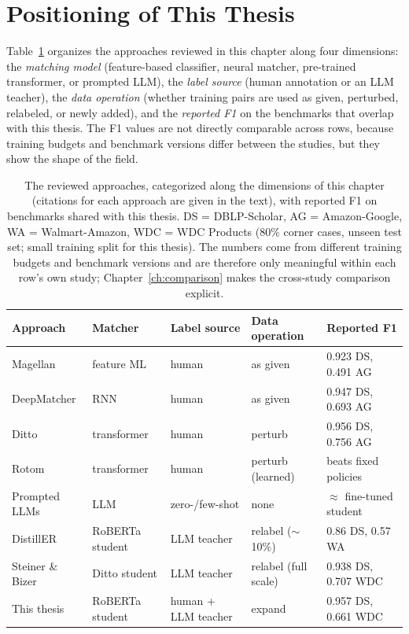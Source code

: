 \documentclass[a4paper,oneside,bibliography=totoc]{scrbook}
\begin{document}
\section{Positioning of This Thesis}
\label{sec:rw_positioning}

Table~\ref{tab:rw_overview} organizes the approaches reviewed in this chapter along four dimensions: the \emph{matching model} (feature-based classifier, neural matcher, pre-trained transformer, or prompted LLM), the \emph{label source} (human annotation or an LLM teacher), the \emph{data operation} (whether training pairs are used as given, perturbed, relabeled, or newly added), and the \emph{reported F1} on the benchmarks that overlap with this thesis. The F1 values are not directly comparable across rows, because training budgets and benchmark versions differ between the studies, but they show the shape of the field.

\begin{table}[!htbp]
  \centering
  \footnotesize
  \setlength{\tabcolsep}{2pt}
  \begin{tabular}{lllll}
    \toprule
    \textbf{Approach} & \textbf{Matcher} & \textbf{Label source} & \textbf{Data operation} & \textbf{Reported F1} \\
    \midrule
    Magellan & feature ML & human & as given & 0.923 DS, 0.491 AG \\
    DeepMatcher & RNN & human & as given & 0.947 DS, 0.693 AG \\
    Ditto & transformer & human & perturb & 0.956 DS, 0.756 AG \\
    Rotom & transformer & human & perturb (learned) & beats fixed policies \\
    Prompted LLMs & LLM & zero-/few-shot & none & $\approx$ fine-tuned student \\
    DistillER & RoBERTa student & LLM teacher & relabel ($\sim$10\%) & 0.86 DS, 0.57 WA \\
    Steiner \& Bizer & Ditto student & LLM teacher & relabel (full scale) & 0.938 DS, 0.707 WDC \\
    This thesis & RoBERTa student & human + LLM teacher & expand & 0.957 DS, 0.661 WDC \\
    \bottomrule
  \end{tabular}
  \caption{The reviewed approaches, categorized along the dimensions of this chapter (citations for each approach are given in the text), with reported F1 on benchmarks shared with this thesis. DS = DBLP-Scholar, AG = Amazon-Google, WA = Walmart-Amazon, WDC = WDC Products (80\% corner cases, unseen test set; small training split for this thesis). The numbers come from different training budgets and benchmark versions and are therefore only meaningful within each row's own study; Chapter~\ref{ch:comparison} makes the cross-study comparison explicit.}
  \label{tab:rw_overview}
\end{table}
\end{document}
